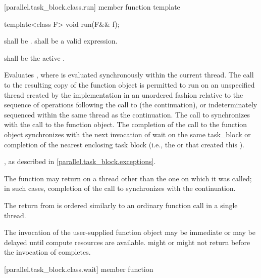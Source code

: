 [parallel.task_block.class.run]{ member function template }

\begin{itemdecl}
template<class F> void run(F&& f);
\end{itemdecl}

\begin{itemdescr}
\pnum
\requires {} shall be .  shall be a valid expression.

\pnum
\preconditions {} shall be the active .

\pnum
\effects Evaluates , where
 is evaluated synchronously within the
current thread. The call to the resulting copy of the function object is
permitted to run on an unspecified thread created by the implementation in an
unordered fashion relative to the sequence of operations following the call to
 (the continuation), or indeterminately sequenced within the same thread
as the continuation. The call to  synchronizes with the call to the function
object. The completion of the call to the function object synchronizes with the
next invocation of wait on the same task_block or completion of the nearest
enclosing task block (i.e., the  or
     that created this ).

\pnum
\throws {}, as described in \ref{parallel.task_block.exceptions}.

\pnum
\remarks The  function may return on a thread other than the
one on which it was called; in such cases, completion of the call to
 synchronizes with the continuation. \begin{note}The return from
 is ordered similarly to an ordinary function call in a single
thread.\end{note}

\pnum
\remarks The invocation of the user-supplied function object 
may be immediate or may be delayed until compute resources are available.
 might or might not return before the invocation of 
completes.

\end{itemdescr}

[parallel.task_block.class.wait]{ member function }


